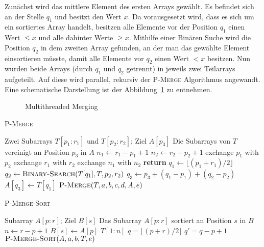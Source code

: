 Zunächst wird das mittlere Element des ersten Arrays gewählt.
Es befindet sich an der Stelle $q_1$ und besitzt den Wert $x$.
Da vorausgesetzt wird, dass es sich um ein sortiertes Array handelt, besitzen
alle Elemente vor der Position $q_1$ einen Wert $\leq x$ und alle dahinter
Werte $\geq x$.
Mithilfe einer Binären Suche wird die Position $q_2$ in dem zweiten Array
gefunden, an der man das gewählte Element einsortieren müsste, damit alle
Elemente vor $q_2$ einen Wert $< x$ besitzen.
Nun wurden beide Arrays (durch $q_1$ und $q_2$ getrennt) in jeweils zwei
Teilarrays aufgeteilt.
Auf diese wird parallel, rekursiv der \textsc{P-Merge} Algorithmus angewandt.
Eine schematische Darstellung ist der Abbildung~\ref{fig:p-merge} zu entnehmen.

\begin{figure}
    \centering
    
    \caption{Multithreaded Merging \cite[S.798]{cormen}}
    \label{fig:p-merge}
\end{figure}

\begin{algorithm}
    \caption{\textsc{P-Merge} \cite[S.800]{cormen}}
    \label{alg:p-merge}
    \begin{algorithmic}[1]
        \Require Zwei Subarrays $T[p_1:r_1]$ und $T[p_2:r_2]$;
            Ziel $A[p_3]$
        \Ensure Die Subarrays von $T$ vereinigt an Position $p_3$ in $A$
        \State $n_1 \gets r_1 - p_1 + 1$
        \State $n_2 \gets r_2 - p_2 + 1$
            \State exchange $p_1$ with $p_2$
            \State exchange $r_1$ with $r_2$
            \State exchange $n_1$ with $n_2$
        \EndIf
            \State \textbf{return}
        \Else
            \State $q_1 \gets \lfloor ( p_1 + r_1 ) / 2 \rfloor$
            \State $q_2 \gets \textsc{Binary-Search}(T[q_1], T, p_2, r_2)$
            \State $q_3 \gets p_3 + (q_1 - p_1) + (q_2 - p_2)$
            \State $A[q_3] \gets T[q_1]$
                \State $\textsc{P-Merge}(T,a, b, c, d, A, e)$
            \EndParDo
        \EndIf
    \end{algorithmic}
\end{algorithm}
%
\begin{algorithm}
    \caption{\textsc{P-Merge-Sort} \cite[S.803]{cormen}}
    \label{alg:p-merge-sort}
    \begin{algorithmic}[1]
        \Require Subarray $A[p:r]$; Ziel $B[s]$
        \Ensure Das Subarray $A[p:r]$ sortiert an Position $s$ in $B$
        \State $n \gets r - p + 1$
            \State $B[s] \gets A[p]$
        \Else
            \State $T[1:n]$
            \State $q = \lfloor (p + r) / 2 \rfloor$
            \State $q' = q - p + 1$
                \State $\textsc{P-Merge-Sort}(A, a, b, T, e)$
            \EndParDo
        \EndIf
    \end{algorithmic}
\end{algorithm}

